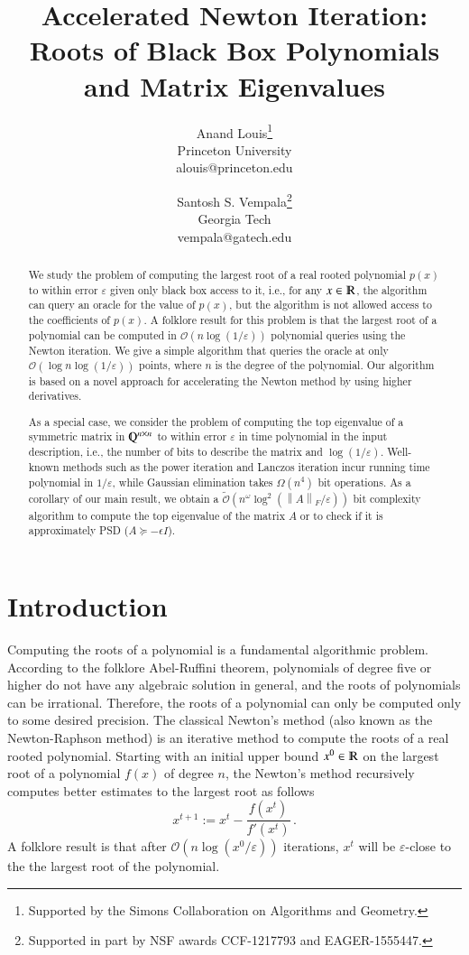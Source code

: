 \documentclass{article}[12pt]
\title{Accelerated Newton Iteration:
 Roots of Black Box Polynomials\\ and Matrix Eigenvalues}
\author{Anand Louis\thanks{Supported by the Simons Collaboration on Algorithms and Geometry.}
\\Princeton University \\alouis@princeton.edu \and 
	Santosh S. Vempala\thanks{Supported in part by NSF awards CCF-1217793 and EAGER-1555447.}
 \\ Georgia Tech \\ vempala@gatech.edu}
\date{}
\theoremstyle{definition}
\renewcommand{\mathbb}{\varmathbb}
\newcommand{\mper}{\,.}
\newcommand{\norm}[1]{\left\lVert#1\right\rVert}
\newcommand{\fnorm}[1]{\norm{#1}_F}
\newcommand{\defeq}{\stackrel{\textup{def}}{=}}
\newcommand{\R}{\mathbb R}
\newcommand{\Q}{\mathbb Q}
\newcommand{\e}{\epsilon}
\let\e\varepsilon
\newcommand{\bigO}{\mathcal{O}}
\newcommand{\bigo}[1]{\bigO\left(#1\right)}
\newcommand{\tbigO}{\tilde{\mathcal{O}}}
\newcommand{\tbigo}[1]{\tbigO\left(#1\right)}
\renewcommand{\defeq}{:=}
\newcommand{\charp}{f}
\def\eps{\epsilon}
\begin{document}
\begin{titlepage}

\maketitle


\begin{abstract}
We study the problem of computing the largest root of a real rooted polynomial $p(x)$ to within error $\e$ given only 
black box access to it, i.e., for any $x \in \R$, the algorithm can query an oracle for the
value of $p(x)$, but the algorithm is not allowed access to the coefficients of $p(x)$. 
A folklore result for this problem is that the largest root of a polynomial can be
computed in $\bigo{n \log (1/\e)}$ polynomial queries 
using the Newton iteration.
We give a simple algorithm that queries the oracle at only $\bigo{{\log n} \log(1/\e)}$ points,
where $n$ is the degree of the polynomial.
Our algorithm is based on a novel approach for accelerating the Newton method by using higher derivatives.

As a special case, we consider the problem of computing the top eigenvalue of a symmetric matrix  in $\Q^{n \times n}$ to within error $\e$ in time polynomial in the input description, i.e., the number of bits to describe the matrix and $\log(1/\e)$. Well-known methods such as the power iteration and Lanczos iteration incur running time  
polynomial in $1/\e$, while Gaussian elimination takes $\Omega(n^4)$ bit operations.
As a corollary of our main result, 
we obtain a $\tbigo{n^{\omega}  \log^2 ( \fnorm{A}/\e)}$  bit complexity algorithm to compute
the top eigenvalue of the matrix $A$ or to check if it is approximately PSD ($A \succeq -\eps I$).
\end{abstract}

\end{titlepage}


\section{Introduction}

Computing the roots of a polynomial is a fundamental algorithmic 
problem. 
According to the folklore Abel-Ruffini theorem,
polynomials of degree five or higher do not have any algebraic solution in general,
and the roots of polynomials can be irrational. Therefore, the roots of a polynomial
can only be computed only to some desired precision. 
The classical Newton's method (also known as the Newton-Raphson method) is an 
iterative method to compute the roots of a real rooted polynomial.
Starting with an initial upper bound $x^0 \in \R$ on the largest root of a polynomial
$\charp(x)$ of degree $n$, the Newton's method recursively computes better estimates
to the largest root as follows
\[ x^{t+1} \defeq x^t - \frac{ \charp(x^t)  }{\charp'(x^t)}  \mper \] 
A folklore result is that after $\bigo{n \log (x^0/\e)}$ iterations, 
$x^t$ will be $\e$-close to the the largest root of the polynomial.
\end{document}
